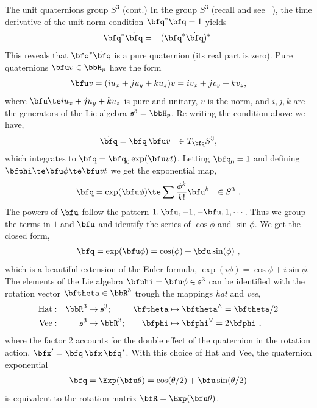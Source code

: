 
\begin{fexample}{The unit quaternions group $S^3$ (cont.)}
\label{ex:S3}
In the  group $S^3$ (recall  and see \eg\ \cite{SOLA-17-Quaternion}), the time derivative of the unit norm condition $\bfq^*\bfq=1$ yields 
%
$$\bfq^*\dot\bfq=-(\bfq^*\dot\bfq)^*
.
$$
%
This reveals that $\bfq^*\dot\bfq$ is a pure quaternion (its real part is zero). 
Pure quaternions $\bfu v\in\bbH_p$ have the form 
%
$$\bfu v=(iu_x+ju_y+ku_z)v =iv_x+jv_y+kv_z 
,$$
%
where $\bfu\te iu_x+ju_y+ku_z$ is pure and unitary, $v$ is the norm, and $i,j,k$ are the generators of the Lie algebra $\frak{s}^3=\bbH_p$.
%
Re-writing the condition above we have,
%
\begin{align*}
\dot\bfq=\bfq\, \bfu v &&\in \mtanat{S^3}{\bfq}
,
\end{align*}
% 
which integrates to $\bfq = \bfq_0\exp(\bfu v t)$. 
Letting $\bfq_0=1$ and defining $\bphi \te \bfu\phi \te\bfu v t$ we get the exponential map,
%
\begin{align*}
\bfq = \exp(\bfu\phi) \te \sum \frac{\phi^k}{k!}\bfu^k &&\in S^3
~.
\end{align*}
%
The powers of $\bfu$ follow the pattern $1,\bfu,-1,-\bfu,1,\cdots$.
Thus we group the terms in $1$ and $\bfu$ and identify the series of $\cos\phi$ and $\sin\phi$.
We get the closed form,
%
\begin{align*}
\bfq = \exp(\bfu\phi) = \cos(\phi) + \bfu\sin(\phi) 
~,
\end{align*}
%
which is a beautiful extension of the Euler formula, $\exp(i\phi)=\cos\phi+i\sin\phi$.
%
The elements of the Lie algebra $\bfphi=\bfu \phi\in\frak{s}^3$ can be identified with the rotation vector $\bth\in\bbR^3$ trough the mappings \emph{hat} and \emph{vee},
%
\begin{align*}
\textrm{Hat}&:& \bbR^3&\to\frak{s}^3;& \bth&\mapsto\bth^\wedge=\bth/2
\\
\textrm{Vee}&:& \frak{s}^3&\to\bbR^3;& \bphi&\mapsto\bphi^\vee=2\bphi
~,
\end{align*}
%
where %
the factor 2 accounts for the double effect of the quaternion in the rotation action, $\bfx'=\bfq\,\bfx\,\bfq^*$. 
%
With this choice of Hat and Vee, the quaternion exponential
%
\begin{align*}
\bfq = \Exp(\bfu\theta)=\cos(\theta/2)+\bfu\sin(\theta/2)
\end{align*}
%
is equivalent to the rotation matrix $\bfR=\Exp(\bfu\theta)$.
\end{fexample}
